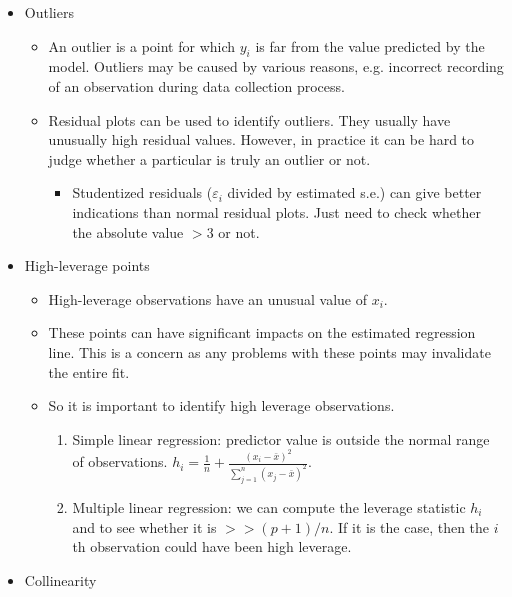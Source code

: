 \documentclass[11pt]{article}
\begin{document}
\begin{itemize}
\begin{itemize}
\begin{itemize}
                \end{itemize}
        \end{itemize}
    \item Outliers
        \begin{itemize}
            \item An outlier is a point for which $y_i$ is far from the value predicted by the model. Outliers may be caused by various reasons, e.g. incorrect recording of an observation during data collection process.
            \item Residual plots can be used to identify outliers. They usually have unusually high residual values. However, in practice it can be hard to judge whether a particular is truly an outlier or not.
                \begin{itemize}
                    \item Studentized residuals ($\varepsilon_i$ divided by estimated s.e.) can give better indications than normal residual plots. Just need to check whether the absolute value $> 3$ or not.
                \end{itemize}
        \end{itemize}
    \item High-leverage points
        \begin{itemize}
            \item High-leverage observations have an unusual value of $x_i$.
            \item These points can have significant impacts on the estimated regression line. This is a concern as any problems with these points may invalidate the entire fit.
            \item So it is important to identify high leverage observations.
                \begin{enumerate}
                    \item Simple linear regression: predictor value is outside the normal range of observations. $h_i = \frac{1}{n} + \frac{(x_i - \bar x)^2}{\sum_{j=1}^{n}{(x_j - \bar x)^2}}$.
                    \item Multiple linear regression: we can compute the leverage statistic $h_i$ and to see whether it is $>> (p+1)/n$. If it is the case, then the $i$th observation could have been high leverage.
                \end{enumerate}
        \end{itemize}
    \item Collinearity
        \begin{itemize}

\end{itemize}
\end{itemize}
\end{document}
